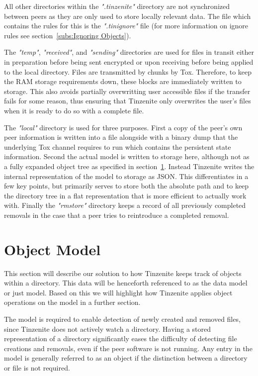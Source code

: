 All other directories within the \textit{".tinzenite"} directory are not synchronized between peers as they are only used to store locally relevant data.
The file which contains the rules for this is the \textit{".tinignore"} file (for more information on ignore rules see section~\ref{subs:Ignoring Objects}).

The \textit{"temp"}, \textit{"received"}, and \textit{"sending"} directories are used for files in transit either in preparation before being sent encrypted or upon receiving before being applied to the local directory.
Files are transmitted by chunks by Tox.
Therefore, to keep the RAM storage requirements down, these blocks are immediately written to storage.
This also avoids partially overwritting user accessible files if the transfer fails for some reason, thus ensuring that Tinzenite only overwrites the user's files when it is ready to do so with a complete file.

The \textit{"local"} directory is used for three purposes.
First a copy of the peer's own peer information is written into a file alongside with a binary dump that the underlying Tox channel requires to run which contains the persistent state information.
Second the actual model is written to storage here, although not as a fully expanded object tree as specified in section~\ref{sec:Object Model}.
Instead Tinzenite writes the internal representation of the model to storage as JSON.
This differentiates in a few key points, but primarily serves to store both the absolute path and to keep the directory tree in a flat representation that is more efficient to actually work with.
Finally the \textit{"rmstore"} directory keeps a record of all previously completed removals in the case that a peer tries to reintroduce a completed removal.

\section{Object Model}
\label{sec:Object Model}

This section will describe our solution to how Tinzenite keeps track of objects within a directory.
This data will be henceforth referenced to as the data model or just model.
Based on this we will highlight how Tinzenite applies object operations on the model in a further section.

The model is required to enable detection of newly created and removed files, since Tinzenite does not actively watch a directory.
Having a stored representation of a directory significantly eases the difficulty of detecting file creations and removals, even if the peer software is not running.
Any entry in the model is generally referred to as an object if the distinction between a directory or file is not required.

